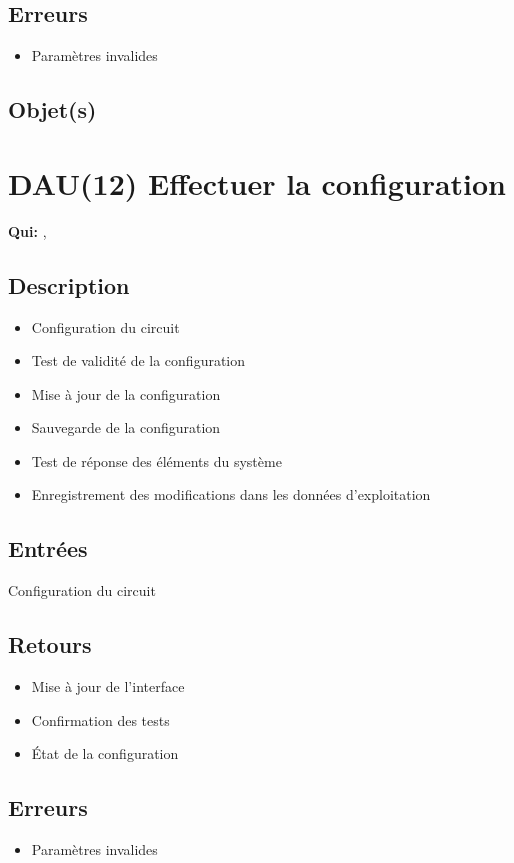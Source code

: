 	\subsection{Erreurs}
	\begin{itemize}
		\item Paramètres invalides \fatal
	\end{itemize}

	\subsection{Objet(s)}
		\allobjs

\section{DAU(12) Effectuer la configuration}
	\textbf{Qui:} \urt, \us

	\subsection{Description}
	\begin{itemize}
		\item Configuration du circuit
		\item Test de validité de la configuration
		\item Mise à jour de la configuration
		\item Sauvegarde de la configuration
		\item Test de réponse des éléments du système
		\item Enregistrement des modifications dans les données d'exploitation
	\end{itemize}

	\subsection{Entrées}
		Configuration du circuit

	\subsection{Retours}
	\begin{itemize}
		\item Mise à jour de l'interface
		\item Confirmation des tests
		\item État de la configuration
	\end{itemize}

	\subsection{Erreurs}
	\begin{itemize}
		\item Paramètres invalides \fatal
	\end{itemize}

